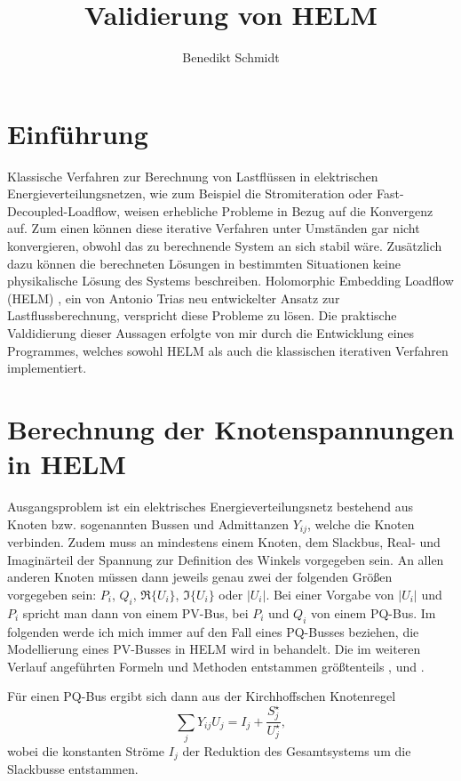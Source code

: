 \documentclass[12pt,a4paper]{article}
\author{Benedikt Schmidt}
\title{Validierung von HELM}
\begin{document}
	\maketitle
	
	\section{Einführung}
	Klassische Verfahren zur Berechnung von Lastflüssen in elektrischen Energieverteilungsnetzen, wie zum Beispiel die Stromiteration oder Fast-Decoupled-Loadflow, weisen erhebliche Probleme in Bezug auf die Konvergenz auf. Zum einen können diese iterative Verfahren unter Umständen gar nicht konvergieren, obwohl das zu berechnende System an sich stabil wäre. Zusätzlich dazu können die berechneten Lösungen in bestimmten Situationen keine physikalische Lösung des Systems beschreiben. Holomorphic Embedding Loadflow (HELM) \cite{helmIEEE}, ein von Antonio Trias neu entwickelter Ansatz zur Lastflussberechnung, verspricht diese Probleme zu lösen. Die praktische Valdidierung dieser Aussagen erfolgte von mir durch die Entwicklung eines Programmes, welches sowohl HELM als auch die klassischen iterativen Verfahren implementiert.
	
	\section{Berechnung der Knotenspannungen in HELM}
	Ausgangsproblem ist ein elektrisches Energieverteilungsnetz bestehend aus Knoten bzw. sogenannten Bussen und Admittanzen $Y_{ij}$, welche die Knoten verbinden. Zudem muss an mindestens einem Knoten, dem Slackbus, Real- und Imaginärteil der Spannung zur Definition des Winkels vorgegeben sein. An allen anderen Knoten müssen dann jeweils genau zwei der folgenden Größen vorgegeben sein: $P_i$, $Q_i$, $\Re\{U_i\}$, $\Im\{U_i\}$ oder $|U_i|$. Bei einer Vorgabe von $|U_i|$ und $P_i$ spricht man dann von einem PV-Bus, bei $P_i$ und $Q_i$ von einem PQ-Bus. Im folgenden werde ich mich immer auf den Fall eines PQ-Busses beziehen, die Modellierung eines PV-Busses in HELM wird in \cite{helmPV} behandelt. Die im weiteren Verlauf angeführten Formeln und Methoden entstammen größtenteils \cite{helmIEEE}, \cite{helmPatentApr2009} und \cite{helmPatentSept2009}.
	
	Für einen PQ-Bus ergibt sich dann aus der Kirchhoffschen Knotenregel
	\begin{equation}
		\sum_j Y_{ij} U_{j} = I_j + \frac{S_j^\star}{U_j^\star},
		\label{eq:loadflow}
	\end{equation}
	wobei die konstanten Ströme $I_j$ der Reduktion des Gesamtsystems um die Slackbusse entstammen.
	
\end{document}

